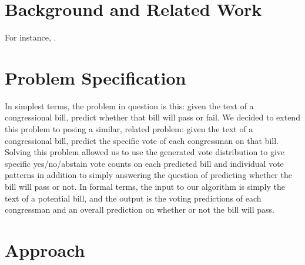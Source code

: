 \documentclass[11pt]{article}
\begin{document}
\iffalse
A description of the purpose, goals, and scope of your system or
empirical investigation.  You should include references to papers you
read on which your project and any algorithms you used are
based. Include a discussion of whether you adapted a published
algorithm or devised a new one, the range of problems and issues you
addressed, and the relation of these problems and issues to the
techniques and ideas covered in the course.
\fi 

\section{Background and Related Work}

For instance, \cite{hochreiter1997long}.


\section{Problem Specification}

In simplest terms, the problem in question is this: given the text of a congressional bill, predict whether that bill will pass or fail. We decided to extend this problem to posing a similar, related problem: given the text of a congressional bill, predict the specific vote of each congressman on that bill. Solving this problem allowed us to use the generated vote distribution to give specific yes/no/abstain vote counts on each predicted bill and individual vote patterns in addition to simply answering the question of predicting whether the bill will pass or not. In formal terms, the input to our algorithm is simply the text of a potential bill, and the output is the voting predictions of each congressman and an overall prediction on whether or not the bill will pass.

\iffalse
A clear description of the problem you are solving in both general terms 
and how you've mapped it to a formal problem specification. 
\fi


\section{Approach}
\end{document}
